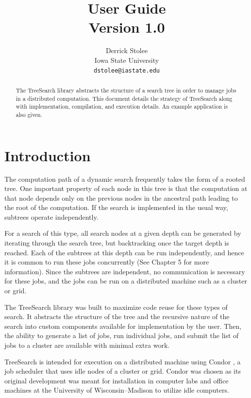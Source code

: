 \documentclass[11pt]{article}
\title{{\TreeSearch} User Guide\\ {\large Version 1.0}}
\author{Derrick Stolee \\ 
	Iowa State University\\ 
	\texttt{dstolee@iastate.edu}
       }
\def\TreeSearch{{TreeSearch}}
\begin{document}
\maketitle
\vspace{-.3in}
\begin{abstract}
	The {\TreeSearch} library abstracts the structure of a search tree
		in order to manage jobs in a distributed computation.
	This document details the strategy of {\TreeSearch} along with
		implementation, compilation, and execution details.
	An example application is also given.
\end{abstract}

\section{Introduction}
\label{sec:Introduction}

The computation path of a dynamic search frequently takes the form of a rooted tree.
One important property of each node in this tree is that the computation at that
	node depends only on the previous nodes in the ancestral path leading
	to the root of the computation.
If the search is implemented in the usual way, subtrees operate independently.

For a search of this type, all search nodes at a given depth 
	can be generated by iterating through the search tree, but 
	backtracking once the target depth is reached.
Each of the subtrees at this depth can be run independently,
	and hence it is common to run these jobs concurrently 
	(See \cite{ClassificationAlgorithms} Chapter 5 for more information).
Since the subtrees are independent, no communication is necessary for 
	these jobs, and the jobs can be run on a distributed machine 
	such as a cluster or grid.

The {\TreeSearch} library was built to maximize code reuse for these types of search.
It abstracts the structure of the tree and the recursive nature of the search into
	custom components available for implementation by the user.
Then, the ability to generate a list of jobs, run individual jobs, and submit the list
	of jobs to a cluster are available with minimal extra work.
	
{\TreeSearch} is intended for execution 
	on a distributed machine using
	Condor \cite{condor-practice},
	a job scheduler that uses idle nodes of a cluster or grid.
Condor was chosen as its original development was meant for
	installation in computer labs and office machines 
	at the University of Wisconsin--Madison
	to utilize idle computers.
	
\end{document}
